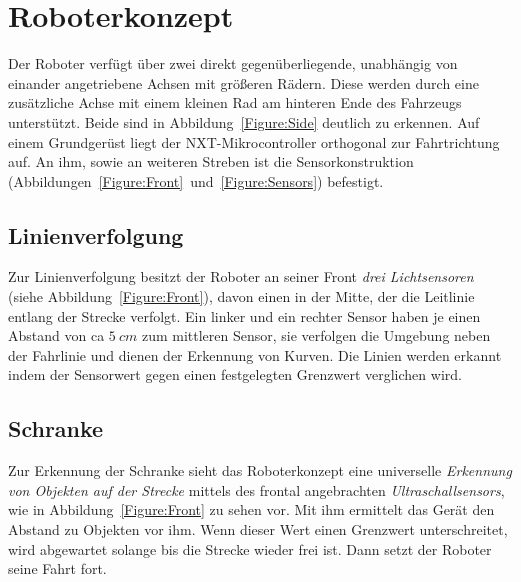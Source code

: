 \section{Roboterkonzept}

Der Roboter verfügt über zwei direkt gegenüberliegende, unabhängig von einander angetriebene Achsen mit größeren Rädern. Diese werden durch eine zusätzliche Achse mit einem kleinen Rad am hinteren Ende des Fahrzeugs unterstützt. Beide sind in Abbildung~\ref{Figure:Side} deutlich zu erkennen. Auf einem Grundgerüst liegt der NXT-Mikrocontroller orthogonal zur Fahrtrichtung auf. An ihm, sowie an weiteren Streben ist die Sensorkonstruktion (Abbildungen~\ref{Figure:Front}~und~\ref{Figure:Sensors}) befestigt.

\subsection{Linienverfolgung}

Zur Linienverfolgung besitzt der Roboter an seiner Front \textit{drei Lichtsensoren} (siehe Abbildung~\ref{Figure:Front}), davon einen in der Mitte, der die Leitlinie entlang der Strecke verfolgt. Ein linker und ein rechter Sensor haben je einen Abstand von ca $5~cm$ zum mittleren Sensor, sie verfolgen die Umgebung neben der Fahrlinie und dienen der Erkennung von Kurven. Die Linien werden erkannt indem der Sensorwert gegen einen festgelegten Grenzwert verglichen wird.

\subsection{Schranke}

Zur Erkennung der Schranke sieht das Roboterkonzept eine universelle \textit{Erkennung von Objekten auf der Strecke} mittels des frontal angebrachten \textit{Ultraschallsensors}, wie in Abbildung~\ref{Figure:Front} zu sehen vor. Mit ihm ermittelt das Gerät den Abstand zu Objekten vor ihm. Wenn dieser Wert einen Grenzwert unterschreitet, wird abgewartet solange bis die Strecke wieder frei ist. Dann setzt der Roboter seine Fahrt fort.


